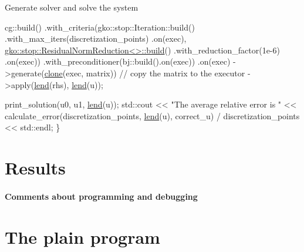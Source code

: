 Generate solver and solve the system


\begin{DoxyCode}
    cg::build()
        .with\_criteria(gko::stop::Iteration::build()
                           .with\_max\_iters(discretization\_points)
                           .on(exec),
                       \hyperlink{classgko_1_1stop_1_1ResidualNormReduction}{gko::stop::ResidualNormReduction<>::build}()
                           .with\_reduction\_factor(1e-6)
                           .on(exec))
        .with\_preconditioner(bj::build().on(exec))
        .on(exec)
        ->generate(\hyperlink{namespacegko_a1beb80750459e4201aa9d882d2d074c3}{clone}(exec, matrix))  \textcolor{comment}{// copy the matrix to the executor}
        ->apply(\hyperlink{namespacegko_aa8cb4876b72e5e1036ea9575443c439b}{lend}(rhs), \hyperlink{namespacegko_aa8cb4876b72e5e1036ea9575443c439b}{lend}(u));

    print\_solution(u0, u1, \hyperlink{namespacegko_aa8cb4876b72e5e1036ea9575443c439b}{lend}(u));
    std::cout << \textcolor{stringliteral}{"The average relative error is "}
              << calculate\_error(discretization\_points, \hyperlink{namespacegko_aa8cb4876b72e5e1036ea9575443c439b}{lend}(u), correct\_u) /
                     discretization\_points
              << std::endl;
\}
\end{DoxyCode}
 \label{_Results}%
\section*{Results}

\label{_Commentsaboutprogramminganddebugging}%
\paragraph*{Comments about programming and debugging }

\label{_PlainProg}%
 \section*{The plain program}


\begin{DoxyCodeInclude}
\end{DoxyCodeInclude}
 